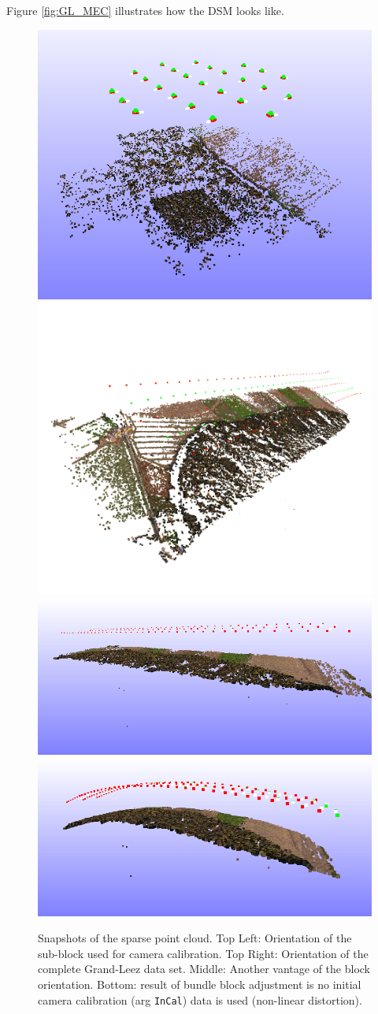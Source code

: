 Figure \ref{fig:GL_MEC} illustrates how the DSM looks like.


\begin{figure}
\centering
\includegraphics[width=0.45\linewidth]{FIGS/UASGrandLeez/Sample4calib.png}
\includegraphics[width=0.45\linewidth]{FIGS/UASGrandLeez/GLori.png}
\includegraphics[width=0.8\linewidth]{FIGS/UASGrandLeez/OriGL-precal.png}
\includegraphics[width=0.8\linewidth]{FIGS/UASGrandLeez/OriGL-autocal.png}
\caption{Snapshots of the sparse point cloud. Top Left: Orientation of the sub-block used for camera calibration. Top Right: Orientation of the complete Grand-Leez data set. Middle: Another vantage of the block orientation. Bottom: result of bundle block adjustment is no initial camera calibration (arg {\tt InCal}) data is used (non-linear distortion).}
\label{fig:GLori}
\end{figure}

